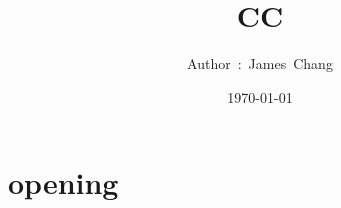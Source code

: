 

\title{CC}
\author{ {\Biohazard} \hspace{1.5mm} \hspace{1.5mm} Author\ :\ James\ Chang}
\date{\today}


\large

\tableofcontents

\chapter{opening}







